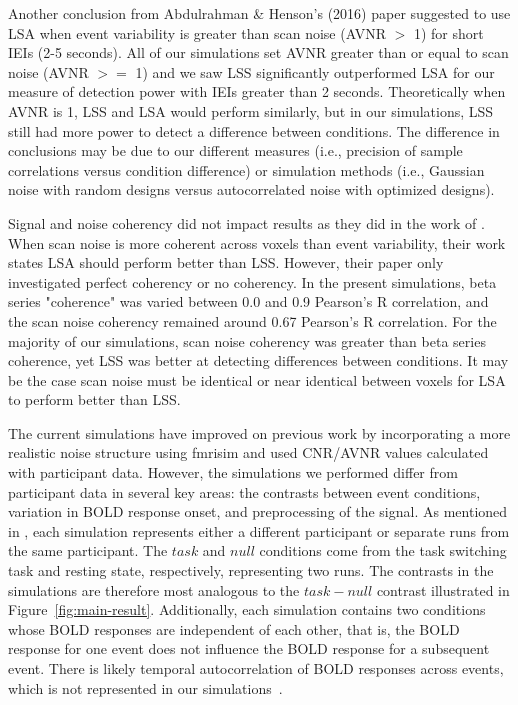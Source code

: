 \documentclass[phd,appendix,figures]{uithesis}
\begin{document}
Another conclusion from Abdulrahman \& Henson's (2016) paper suggested to
use LSA when event variability is greater than scan noise (AVNR $>$ 1) for short IEIs (2-5 seconds).
All of our simulations set AVNR greater than or equal to scan noise (AVNR $>=$ 1) and we saw
LSS significantly outperformed LSA for our measure of detection power with IEIs greater than 2 seconds.
Theoretically when AVNR is 1, LSS and LSA would perform similarly, but in our simulations,
LSS still had more power to detect a difference between conditions.
The difference in conclusions may be due to our different measures (i.e., precision of sample correlations versus condition difference)
or simulation methods (i.e., Gaussian noise with random designs versus autocorrelated noise with optimized designs).

Signal and noise coherency did not impact results as they did in the work of \cite[Abdulrahman \& Henson (2016)]{Abdulrahman2016}.
When scan noise is more coherent across voxels than event variability,
their work states LSA should perform better than LSS.
However, their paper only investigated perfect coherency or no coherency.
In the present simulations, beta series "coherence" was varied between 0.0 and 0.9 Pearson's R correlation,
and the scan noise coherency remained around 0.67 Pearson's R correlation.
For the majority of our simulations, scan noise coherency was greater than beta series
coherence, yet LSS was better at detecting differences between conditions.
It may be the case scan noise must be identical or near identical between voxels
for LSA to perform better than LSS.

The current simulations have improved on previous work by incorporating a more
realistic noise structure using fmrisim and used CNR/AVNR values calculated with participant data.
However, the simulations we performed differ from participant data in several key areas:
the contrasts between event conditions,
variation in BOLD response onset, and preprocessing of the signal.
As mentioned in , each simulation represents
either a different participant or separate runs from the same participant.
The $task$ and $null$ conditions come from the task switching task and resting state,
respectively, representing two runs.
The contrasts in the simulations are therefore most analogous to the $task - null$
contrast illustrated in Figure~\ref{fig:main-result}.
Additionally, each simulation contains two conditions whose BOLD responses
are independent of each other, that is, the BOLD response for one event
does not influence the BOLD response for a subsequent event.
There is likely temporal autocorrelation of BOLD responses across events,
which is not represented in our simulations~\cite{Abdulrahman2016}.
\end{document}

